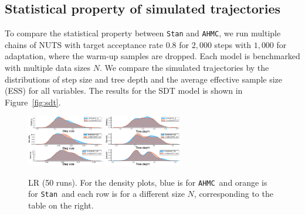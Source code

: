 \documentclass[tablecaption=bottom,wcp]{jmlr} %
\def\ahmc{\texttt{AHMC}}
\def\stan{\texttt{Stan}}
\begin{document}
\subsection{Statistical property of simulated trajectories}
To compare the statistical property between \texttt{Stan} and \texttt{AHMC},
we run multiple chains of NUTS with target acceptance rate $0.8$ 
for $2,000$ steps with $1,000$ for adaptation,
where the warm-up samples are dropped.
Each model is benchmarked with multiple data sizes $N$.
We compare the simulated trajectories by the distributions of step size and tree depth and the average effective sample size (ESS) for all variables. The results for the SDT model is shown in Figure~\ref{fig:sdt}.
\begin{figure}[t]
    \includegraphics[width=0.3\textwidth]{images/Linear_Regression/density_epsilon.pdf}
    \includegraphics[width=0.3\textwidth]{images/Linear_Regression/density_tree_depth.pdf}
    \;\hfill
    \vspace{-0.25in}
    \caption{LR (50 runs). For the density plots, blue is for \ahmc~and orange is for \stan~and each row is for a different size $N$, corresponding to the table on the right.}
    \vspace{-0.2in}
\end{figure}
\end{document}
